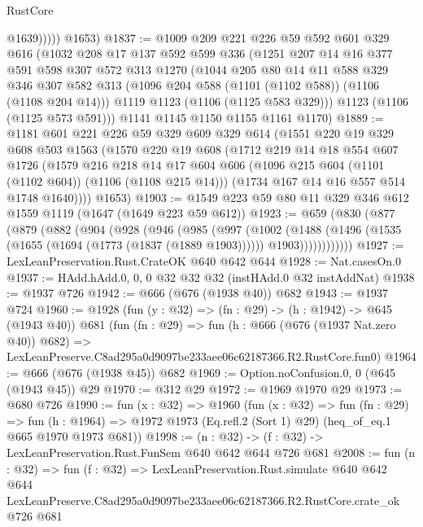 \begin{lexlean}{RustCore}
\begin{coremodule}
                @1639)))))
      @1653)
@1837 := @1009
    @209
    @221
    @226
    @59
    @592
    @601
    @329
    @616
    (@1032
      @208
      @17
      @137
      @592
      @599
      @336
      (@1251
        @207
        @14
        @16
        @377
        @591
        @598
        @307
        @572
        @313
        @1270
        (@1044
          @205
          @80
          @14
          @11
          @588
          @329
          @346
          @307
          @582
          @313
          (@1096 @204 @588 (@1101 (@1102 @588)) (@1106 (@1108 @204 @14)))
          @1119
          @1123
          (@1106 (@1125 @583 @329)))
        @1123
        (@1106 (@1125 @573 @591)))
      @1141
      @1145
      @1150
      @1155
      @1161
      @1170)
@1889 := @1181
    @601
    @221
    @226
    @59
    @329
    @609
    @329
    @614
    (@1551
      @220
      @19
      @329
      @608
      @503
      @1563
      (@1570
        @220
        @19
        @608
        (@1712
          @219
          @14
          @18
          @554
          @607
          @1726
          (@1579
            @216
            @218
            @14
            @17
            @604
            @606
            (@1096 @215 @604 (@1101 (@1102 @604)) (@1106 (@1108 @215 @14)))
            (@1734 @167 @14 @16 @557 @514 @1748 @1640))))
      @1653)
@1903 := @1549 @223 @59 @80 @11 @329 @346 @612 @1559 @1119 (@1647 (@1649 @223 @59 @612))
@1923 := @659
    (@830
      (@877
        (@879
          (@882
            (@904
              (@928
                (@946
                  (@985
                    (@997
                      (@1002
                        (@1488
                          (@1496
                            (@1535 (@1655 (@1694 (@1773 (@1837 (@1889 @1903))))))
                            @1903))))))))))))
@1927 := LexLeanPreservation.Rust.CrateOK @640 @642 @644
@1928 := Nat.casesOn.{0}
@1937 := HAdd.hAdd.{0, 0, 0} @32 @32 @32 (instHAdd.{0} @32 instAddNat)
@1938 := @1937 @726
@1942 := @666 (@676 (@1938 @40)) @682
@1943 := @1937 @724
@1960 := @1928
    (fun (y : @32) => (fn : @29) -> (h : @1942) -> @645 (@1943 @40))
    @681
    (fun (fn : @29) =>
    fun (h : @666 (@676 (@1937 Nat.zero @40)) @682) =>
    LexLeanPreserve.C8ad295a0d9097be233aee06c62187366.R2.RustCore.fun0)
@1964 := @666 (@676 (@1938 @45)) @682
@1969 := Option.noConfusion.{0, 0} (@645 (@1943 @45)) @29
@1970 := @312 @29
@1972 := @1969 @1970 @29
@1973 := @680 @726
@1990 := fun (x : @32) =>
  @1960
    (fun (x : @32) =>
    fun (fn : @29) =>
    fun (h : @1964) => @1972 @1973 (Eq.refl.{2} (Sort 1) @29) (heq_of_eq.{1} @665 @1970 @1973 @681))
@1998 := (n : @32) -> (f : @32) -> LexLeanPreservation.Rust.FunSem @640 @642 @644 @726 @681
@2008 := fun (n : @32) =>
  fun (f : @32) =>
  LexLeanPreservation.Rust.simulate
    @640
    @642
    @644
    LexLeanPreserve.C8ad295a0d9097be233aee06c62187366.R2.RustCore.crate_ok
    @726
    @681
\end{coremodule}
\end{lexlean}
